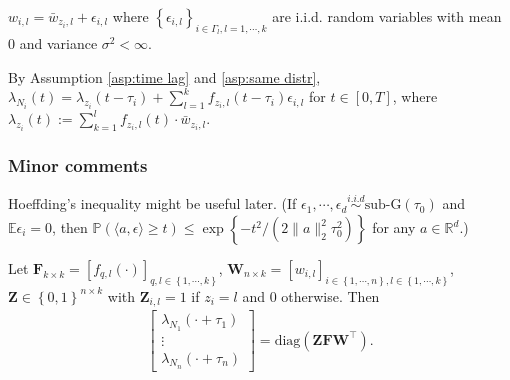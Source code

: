 \begin{assumption}\label{asp:same distr}
$w_{i,l}=\bar w_{z_i,l}+\epsilon_{i,l}$ where $\left\{ \epsilon_{i,l} \right\}_{i\in\Gamma_l,l=1,\cdots,k}$ are i.i.d. random variables with mean $0$ and variance $\sigma^2<\infty$.
\end{assumption}
\noindent
By Assumption \ref{asp:time lag} and \ref{asp:same distr}, $\lambda_{N_i}(t)=\lambda_{z_i}(t-\tau_i)+\sum_{l=1}^kf_{z_i,l}(t-\tau_i)\epsilon_{i,l}$ for $t\in[0,T]$, where $\lambda_{z_i}(t):=\sum_{k=1}^lf_{z_i,l}(t)\cdot\bar w_{z_i,l}$.

\subsubsection*{Minor comments}
Hoeffding's inequality might be useful later. (If $\epsilon_{1},\cdots,\epsilon_d\overset{i.i.d}{\sim}\text{sub-G}(\tau_0)$ and $\mathbb{E}\epsilon_{i}=0$, then $\mathbb{P}(\langle a,\epsilon\rangle\geq t)\leq \exp \left\{ -t^2/(2\|a\|_2^2\tau_0^2) \right\}$ for any $a\in \mathbb{R}^d$.)

Let $\mathbf{F}_{k\times k} = [f_{q,l}(\cdot)]_{q,l\in \left\{ 1,\cdots,k \right\}}$, $\mathbf W_{n\times k} = [w_{i,l}]_{i\in \left\{ 1,\cdots,n \right\}, l\in \left\{ 1,\cdots,k \right\}}$, $\mathbf{Z}\in \left\{ 0,1 \right\}^{n\times k}$ with $\mathbf Z_{i,l}=1$ if $z_i=l$ and $0$ otherwise. Then
\begin{align*}
\begin{bmatrix}
\lambda_{N_1}(\cdot+\tau_1)\\
\vdots\\
\lambda_{N_n}(\cdot+\tau_n)
\end{bmatrix}=\text{diag}\left( \mathbf{ZFW}^\top \right) .
\end{align*}

